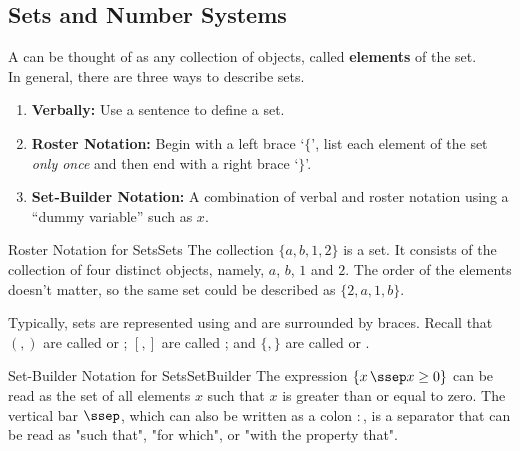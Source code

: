 \subsection{Sets and Number Systems}

A  can be thought of as any collection of  objects, called {\bf{elements}} of the set.\\

In general, there are three ways to describe sets.  

	
\begin{formulabox}
	
	\begin{enumerate}
		
		\item \textbf{Verbally:} Use a sentence to define a set.
		
		\item \textbf{Roster Notation:}  Begin with a left brace `$\{$', list each element of the set \textit{only once} and then end with a right brace `$\}$'.
		
		\item \textbf{Set-Builder Notation:} A combination of verbal and roster notation using a ``dummy variable'' such as $x$.
	\end{enumerate}
\end{formulabox} 	


\begin{example}{Roster Notation for Sets}{Sets}
	The collection $\{a,b,1,2\}$ is a set. It consists of the collection of
	four distinct objects, namely, $a$, $b$, $1$ and $2$. The order of the elements doesn't matter, so the same set could be described as $\{2,a,1,b\}$. 
\end{example}

Typically, sets are represented using 
 and are surrounded by braces.
Recall that $(,)$ are called  or ;
$[,]$ are called ; and $\{,\}$ are called  or . \\

\begin{example}{Set-Builder Notation for Sets}{SetBuilder}
The expression $\displaystyle{ \{x \, \ssep  x \geq 0 \} }$ can be read as the set of all elements $x$ such that $x$ is greater than or equal to zero.  The vertical bar $\ssep$, which can also be written as a colon $:$, is a separator that can be read as "such that", "for which", or "with the property that". 
\end{example}	

